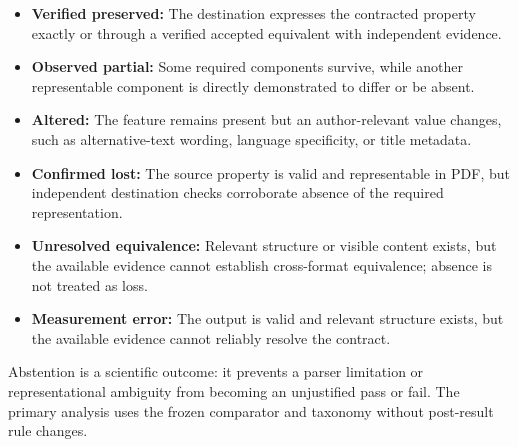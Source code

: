\begin{itemize}
\item \textbf{Verified preserved:} The destination expresses the contracted property exactly or through a verified accepted equivalent with independent evidence.
\item \textbf{Observed partial:} Some required components survive, while another representable component is directly demonstrated to differ or be absent.
\item \textbf{Altered:} The feature remains present but an author-relevant value changes, such as alternative-text wording, language specificity, or title metadata.
\item \textbf{Confirmed lost:} The source property is valid and representable in PDF, but independent destination checks corroborate absence of the required representation.
\item \textbf{Unresolved equivalence:} Relevant structure or visible content exists, but the available evidence cannot establish cross-format equivalence; absence is not treated as loss.
\item \textbf{Measurement error:} The output is valid and relevant structure exists, but the available evidence cannot reliably resolve the contract.
\end{itemize}

Abstention is a scientific outcome: it prevents a parser limitation or representational ambiguity from becoming an unjustified pass or fail. The primary analysis uses the frozen comparator and taxonomy without post-result rule changes.
